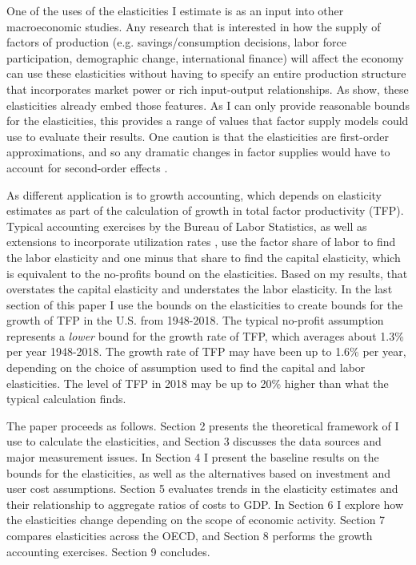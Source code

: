 \documentclass[11pt]{article}
\begin{document}
One of the uses of the elasticities I estimate is as an input into other macroeconomic studies. Any research that is interested in how the supply of factors of production (e.g. savings/consumption decisions, labor force participation, demographic change, international finance) will affect the economy can use these elasticities without having to specify an entire production structure that incorporates market power or rich input-output relationships. As \cite{bfshortnote,bfprodge} show, these elasticities already embed those features. As I can only provide reasonable bounds for the elasticities, this provides a range of values that factor supply models could use to evaluate their results. One caution is that the elasticities are first-order approximations, and so any dramatic changes in factor supplies would have to account for second-order effects \citep{bfmicro}. 

As different application is to growth accounting, which depends on elasticity estimates as part of the calculation of growth in total factor productivity (TFP). Typical accounting exercises by the Bureau of Labor Statistics, as well as extensions to incorporate utilization rates \citep{kfb2006,fernald2014}, use the factor share of labor to find the labor elasticity and one minus that share to find the capital elasticity, which is equivalent to the no-profits bound on the elasticities. Based on my results, that overstates the capital elasticity and understates the labor elasticity. In the last section of this paper I use the bounds on the elasticities to create bounds for the growth of TFP in the U.S. from 1948-2018. The typical no-profit assumption represents a \textit{lower} bound for the growth rate of TFP, which averages about 1.3\% per year 1948-2018. The growth rate of TFP may have been up to 1.6\% per year, depending on the choice of assumption used to find the capital and labor elasticities. The level of TFP in 2018 may be up to 20\% higher than what the typical calculation finds. 

The paper proceeds as follows. Section 2 presents the theoretical framework of \cite{bfshortnote,bfprodge} I use to calculate the elasticities, and Section 3 discusses the data sources and major measurement issues. In Section 4 I present the baseline results on the bounds for the elasticities, as well as the alternatives based on investment and user cost assumptions. Section 5 evaluates trends in the elasticity estimates and their relationship to aggregate ratios of costs to GDP. In Section 6 I explore how the elasticities change depending on the scope of economic activity. Section 7 compares elasticities across the OECD, and Section 8 performs the growth accounting exercises. Section 9 concludes.
\end{document}
